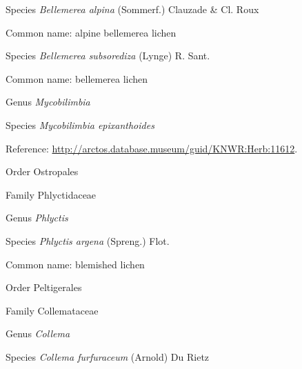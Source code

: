 \documentclass[9pt, article]{memoir}
\begin{document}
\begin{multicols}{2}
\vspace{6pt}\noindent\hspace{36pt}Species \textit{Bellemerea alpina} (Sommerf.) Clauzade \& Cl. Roux


Common name: alpine bellemerea lichen

\vspace{6pt}\noindent\hspace{36pt}Species \textit{Bellemerea subsorediza} (Lynge) R. Sant.


Common name: bellemerea lichen

\vspace{6pt}\noindent\hspace{30pt}Genus \textit{Mycobilimbia}


\vspace{6pt}\noindent\hspace{36pt}Species \textit{Mycobilimbia epixanthoides}


Reference: 
\url{http://arctos.database.museum/guid/KNWR:Herb:11612}.

\vspace{6pt}\noindent\hspace{18pt}Order Ostropales


\vspace{6pt}\noindent\hspace{24pt}Family Phlyctidaceae


\vspace{6pt}\noindent\hspace{30pt}Genus \textit{Phlyctis}


\vspace{6pt}\noindent\hspace{36pt}Species \textit{Phlyctis argena} (Spreng.) Flot.


Common name: blemished lichen

\vspace{6pt}\noindent\hspace{18pt}Order Peltigerales


\vspace{6pt}\noindent\hspace{24pt}Family Collemataceae


\vspace{6pt}\noindent\hspace{30pt}Genus \textit{Collema}


\vspace{6pt}\noindent\hspace{36pt}Species \textit{Collema furfuraceum} (Arnold) Du Rietz



\end{multicols}
\end{document}
